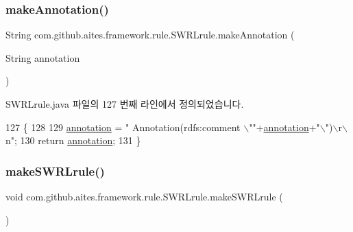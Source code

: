 \subsubsection{\texorpdfstring{make\+Annotation()}{makeAnnotation()}}
{\footnotesize\ttfamily String com.\+github.\+aites.\+framework.\+rule.\+S\+W\+R\+Lrule.\+make\+Annotation (\begin{DoxyParamCaption}\item[{String}]{annotation }\end{DoxyParamCaption})\hspace{0.3cm}{\ttfamily [private]}}



S\+W\+R\+Lrule.\+java 파일의 127 번째 라인에서 정의되었습니다.


\begin{DoxyCode}
127                                                     \{
128   
129         \mbox{\hyperlink{classcom_1_1github_1_1aites_1_1framework_1_1rule_1_1_s_w_r_lrule_af98a0b14045d483b30ad511f0627fe3f}{annotation}} = \textcolor{stringliteral}{"        Annotation(rdfs:comment \(\backslash\)""}+\mbox{\hyperlink{classcom_1_1github_1_1aites_1_1framework_1_1rule_1_1_s_w_r_lrule_af98a0b14045d483b30ad511f0627fe3f}{annotation}}+\textcolor{stringliteral}{"\(\backslash\)")\(\backslash\)r\(\backslash\)n"};
130         \textcolor{keywordflow}{return} \mbox{\hyperlink{classcom_1_1github_1_1aites_1_1framework_1_1rule_1_1_s_w_r_lrule_af98a0b14045d483b30ad511f0627fe3f}{annotation}};
131     \}
\end{DoxyCode}
\mbox{\label{classcom_1_1github_1_1aites_1_1framework_1_1rule_1_1_s_w_r_lrule_a8b6f04d7d532e8150e4be3ba796c28e9}} 
\subsubsection{\texorpdfstring{make\+S\+W\+R\+Lrule()}{makeSWRLrule()}}
{\footnotesize\ttfamily void com.\+github.\+aites.\+framework.\+rule.\+S\+W\+R\+Lrule.\+make\+S\+W\+R\+Lrule (\begin{DoxyParamCaption}{ }\end{DoxyParamCaption})}



